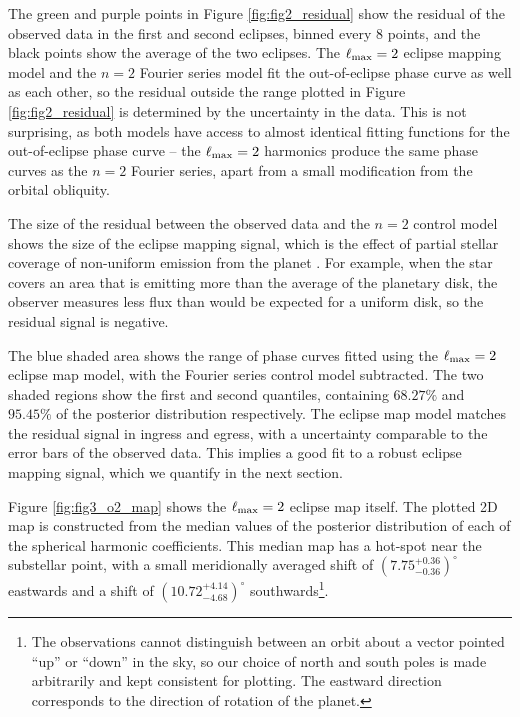 \documentclass[twocolumn]{aastex631}
\begin{document}
The green and purple points in Figure \ref{fig:fig2_residual} show the residual of the observed data in the first and second eclipses, binned every 8 points, and the black points show the average of the two eclipses. The $\ell_{\rm max}=2$ eclipse mapping model and the $n=2$ Fourier series model fit the out-of-eclipse phase curve as well as each other, so the residual outside the range plotted in Figure \ref{fig:fig2_residual} is determined by the uncertainty in the data. This is not surprising, as both models have access to almost identical fitting functions for the out-of-eclipse phase curve -- the $\ell_{\rm max}=2$ harmonics produce the same phase curves as the $n=2$ Fourier series, apart from a small modification from the orbital obliquity.

The size of the residual between the observed data and the $n=2$ control model shows the size of the eclipse mapping signal, which is the effect of partial stellar coverage of non-uniform emission from the planet \citep{de2012towards}. For example, when the star covers an area that is emitting more than the average of the planetary disk, the observer measures less flux than would be expected for a uniform disk, so the residual signal is negative. 

The blue shaded area shows the range of phase curves fitted using the $\ell_{\rm max}=2$ eclipse map model, with the Fourier series control model subtracted. The two shaded regions show the first and second quantiles, containing $68.27\%$ and $95.45\%$ of the posterior distribution respectively. The eclipse map model matches the residual signal in ingress and egress, with a uncertainty comparable to the error bars of the observed data. This implies a good fit to a robust eclipse mapping signal, which we quantify in the next section.

Figure \ref{fig:fig3_o2_map} shows the $\ell_{\rm max}=2$ eclipse map itself. The plotted 2D map is constructed from the median values of the posterior distribution of each of the spherical harmonic coefficients. This median map has a hot-spot near the substellar point, with a small meridionally averaged shift of $(7.75^{+0.36}_{-0.36})^{\circ}$ eastwards and a shift of $( 10.72 ^{+ 4.14 } _{- 4.68 })^{\circ}$ southwards\footnote{The observations cannot distinguish between an orbit about a vector pointed ``up'' or ``down'' in the sky, so our choice of north and south poles is made arbitrarily and kept consistent for plotting. The eastward direction corresponds to the direction of rotation of the planet.}.
\end{document}
